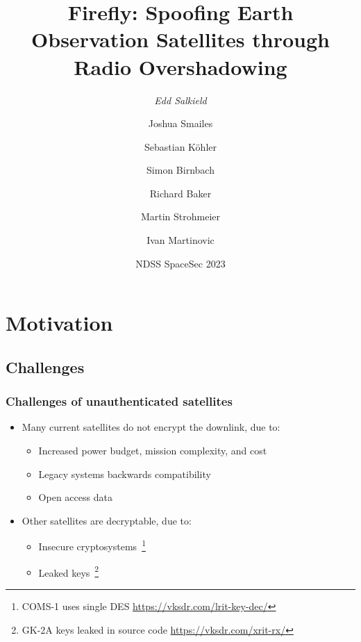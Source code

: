 \documentclass[aspectratio=169]{beamer}
\begin{document}
\bgroup
\let\oldfootnoterule\footnoterule
{}

\title[Spoofing Earth Observation Satellites through Radio Overshadowing]{Firefly: Spoofing Earth Observation Satellites through Radio Overshadowing}
\author[Edd Salkield]{
  \emph{Edd Salkield}
  \and
  Joshua Smailes
  \and
  Sebastian Köhler
  \and
  Simon Birnbach
  \and
  Richard Baker
  \and
  Martin Strohmeier
  \and
  Ivan Martinovic
}
\date{NDSS SpaceSec 2023}

\makeoxfordtitle


\section{Motivation}
\subsection{Challenges}

\def\footnoterule{\only<6->\oldfootnoterule}
\begin{frame}
  \frametitle{Challenges of unauthenticated satellites}
  \begin{itemize}[<+->]
    \item Many current satellites do not encrypt the downlink, due to:
    \begin{itemize}[<+->]
      \item Increased power budget, mission complexity, and cost
      \item Legacy systems backwards compatibility
      \item Open access data
    \end{itemize}
    
    \item Other satellites are decryptable, due to:
    \begin{itemize}[<+->]
      \item Insecure cryptosystems~\footnote<6->{COMS-1 uses single DES \url{https://vksdr.com/lrit-key-dec/}}
      \item Leaked keys~\footnote<7->{GK-2A keys leaked in source code \url{https://vksdr.com/xrit-rx/}}
    \end{itemize}
  \end{itemize}
\end{frame}
\end{document}
